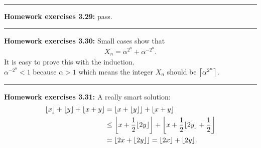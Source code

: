 \documentclass{article}
\DeclarePairedDelimiter\ceil{\lceil}{\rceil}
\DeclarePairedDelimiter\floor{\lfloor}{\rfloor}
\begin{document}
\noindent\rule{\textwidth}{0.4pt}
\textbf{Homework exercises 3.29:}
pass.

\noindent\rule{\textwidth}{0.4pt}
\textbf{Homework exercises 3.30:}
Small cases show that 
\begin{align}
X_n = \alpha^{2^n} + \alpha^{-2^n}.
\end{align}
It is easy to prove this with the induction.\\
$\alpha^{-2^n} < 1$ because $\alpha > 1$ which means the integer $X_n$ should be $\ceil*{\alpha^{2^n}}$.

\noindent\rule{\textwidth}{0.4pt}
\textbf{Homework exercises 3.31:}
A really smart solution:
\begin{align}
\floor{x} + \floor{y} + \floor{x + y} &= \floor{x + \floor{y}} + \floor{x + y} \\
				      &\le \floor*{x + \frac{1}{2}\floor{2y}} + \floor*{x + \frac{1}{2}\floor{2y} + \frac{1}{2}} \\
				      &= \floor*{2x + \floor{2y}} = \floor{2x} + \floor{2y}.
\end{align}
\end{document}
